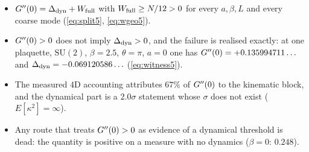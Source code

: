 \begin{itemize}
\item \LT{} $G''(0)=\Delta_{\mathrm{dyn}}+W_{\mathrm{full}}$ with $W_{\mathrm{full}}\ge N/12>0$ for every $a,\beta,L$ and every coarse mode
      (\eqref{eq:split5}, \eqref{eq:wgeo5}).
\item \LT{} $G''(0)>0$ does not imply $\Delta_{\mathrm{dyn}}>0$, and the failure is realised exactly: at one
      plaquette, $\mathrm{SU}(2)$, $\beta=2.5$, $\theta=\pi$, $a=0$ one has
      $G''(0)=+0.135994711\ldots$ and $\Delta_{\mathrm{dyn}}=-0.069120586\ldots$ (\eqref{eq:witness5}).
\item \LT{} The measured $4$D accounting attributes $67\%$ of $G''(0)$ to the kinematic block, and
      the dynamical part is a $2.0\sigma$ statement whose $\sigma$ does not exist
      ($E[\kappa^{2}]=\infty$).
\item \LN{} Any route that treats $G''(0)>0$ as evidence of a dynamical threshold is dead: the
      quantity is positive on a measure with no dynamics ($\beta=0$: $0.248$).
\end{itemize}
